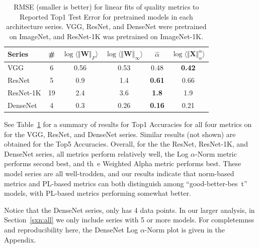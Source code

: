 \begin{table}[t]
\small
\begin{center}
\begin{tabular}{|p{0.75in}|c|c|c|c|c|}
\hline
 Series    &\#   & $\log\langle\Vert\mathbf{W}\Vert_{F}\rangle$ & $\log\langle\Vert\mathbf{W}\Vert_{\infty}\rangle$ & $\hat{\alpha}$ & $\log\langle\Vert\mathbf{X}\Vert^{\alpha}_{\alpha}\rangle$ \\
\hline
 VGG       &  6 & 0.56 & 0.53 & 0.48          & \textbf{0.42}  \\
 ResNet    &  5 & 0.9  & 1.4  & \textbf{0.61} & 0.66           \\
 ResNet-1K & 19 & 2.4  & 3.6  & \textbf{1.8}  & 1.9            \\
 DenseNet  &  4 & 0.3  & 0.26 & \textbf{0.16} & 0.21           \\
\hline
\end{tabular}
\end{center}
\caption{RMSE (smaller is better) for linear fits of quality metrics to Reported Top1 Test Error for pretrained models in each architecture series.  VGG, ResNet, and DenseNet were pretrained on ImageNet, and ResNet-1K was pretrained on ImageNet-1K. 
}
\label{table:cv-models}
\end{table}

See Table~\ref{table:cv-models} for a summary of results for Top1 Accuracies for all four metrics on for the VGG, ResNet, and DenseNet series.
Similar results (not shown) are obtained for the Top5 Accuracies.
Overall, for the the ResNet, ResNet-1K, and DenseNet series, all metrics perform relatively well, the Log $\alpha$-Norm metric performs second best, and th\
e Weighted Alpha metric performs best.
These model series are all well-trodden, and our results indicate that norm-based metrics and PL-based metrics can both distinguish among ``good-better-bes\
t'' models, with PL-based metrics performing somewhat better.

Notice that the DenseNet series,  only has 4 data points.  In our larger analysis, in Section~\ref{sxn:all} we only include series with 5 or more models.
For completemnss and reproducibility here, the DenseNet Log $\alpha$-Norm plot is given in the Appendix.

